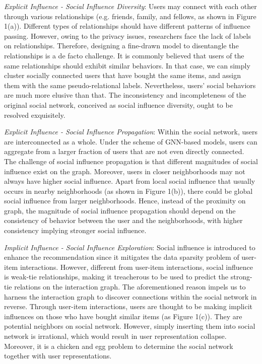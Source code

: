 \documentclass[letterpaper]{article} %
\begin{document}
\textit{Explicit Influence \uppercase\expandafter{} - Social Influence Diversity}: Users may connect with each other through various relationships (e.g. friends, family, and fellows, as shown in Figure 1(a)). Different types of relationships should have different patterns of influence passing. However, owing to the privacy issues, researchers face the lack of labels on relationships. Therefore, designing a fine-drawn model to disentangle the relationships is a de facto challenge. It is commonly believed that users of the same relationships should exhibit similar behaviors. In that case, we can simply cluster socially connected users that have bought the same items, and assign them with the same pseudo-relational labels. Nevertheless, users' social behaviors are much more elusive than that. The inconsistency and incompleteness of the original social network, conceived as social influence diversity, ought to be resolved exquisitely.

\textit{Explicit Influence \uppercase\expandafter{} - Social Influence Propagation}: Within the social network, users are interconnected as a whole. Under the scheme of GNN-based models, users can aggregate from a larger fraction of users that are not even directly connected. The challenge of social influence propagation is that different magnitudes of social influence exist on the graph. Moreover, users in closer neighborhoods may not always have higher social influence. Apart from local social influence that usually occurs in nearby neighborhoods (as shown in Figure 1(b)), there could be global social influence from larger neighborhoods. Hence, instead of the proximity on graph, the magnitude of social influence propagation should depend on the consistency of behavior between the user and the neighborhoods, with higher consistency implying stronger social influence.

\textit{Implicit Influence - Social Influence Exploration}: Social influence is introduced to enhance the recommendation since it mitigates the data sparsity problem of user-item interactions. However, different from user-item interactions, social influence is weak-tie relationships, making it treacherous to be used to predict the strong-tie relations on the interaction graph. The aforementioned reason impels us to harness the interaction graph to discover connections within the social network in reverse. Through user-item interactions, users are thought to be making implicit influences on those who have bought similar items (as Figure 1(c)). They are potential neighbors on social network. However, simply inserting them into social network is irrational, which would result in user representation collapse. Moreover, it is a chicken and egg problem to determine the social network together with user representations.
\end{document}
